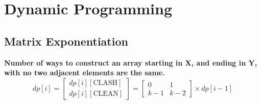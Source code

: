 \chapter{Dynamic Programming}



\section{Matrix Exponentiation}


\begin{example}{}
\textbf{Number of ways to construct an array starting in X, and ending in Y, with no two adjacent elements are the same.}
\begin{equation*}
    dp[i] = \begin{bmatrix} dp[i][\text{CLASH}] \\ dp[i][\text{CLEAN}] \end{bmatrix}
    = \begin{bmatrix} 0 & 1 \\ k-1 & k-2 \end{bmatrix} \times dp[i-1]
\end{equation*}
\end{example}

